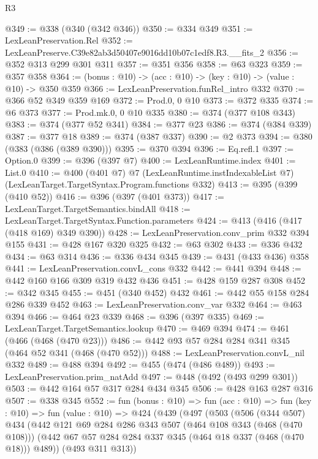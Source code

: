 \begin{lexlean}{R3}
\begin{coremodule}
@349 := @338 (@340 (@342 @346))
@350 := @334 @349
@351 := LexLeanPreservation.Rel
@352 := LexLeanPreserve.C39e82ab3d50407e9016dd10b07c1edf8.R3.__fits_2
@356 := @352 @313 @299 @301 @311
@357 := @351 @356
@358 := @63 @323
@359 := @357 @358
@364 := (bonus : @10) -> (acc : @10) -> (key : @10) -> (value : @10) -> @350 @359
@366 := LexLeanPreservation.funRel_intro @332
@370 := @366 @52 @349 @359 @169
@372 := Prod.{0, 0} @10
@373 := @372 @335
@374 := @6 @373
@377 := Prod.mk.{0, 0} @10 @335
@380 := @374 (@377 @108 @343)
@383 := @374 (@377 @52 @341)
@384 := @377 @23
@386 := @374 (@384 @339)
@387 := @377 @18
@389 := @374 (@387 @337)
@390 := @2 @373
@394 := @380 (@383 (@386 (@389 @390)))
@395 := @370 @394
@396 := Eq.refl.{1}
@397 := Option.{0}
@399 := @396 (@397 @7)
@400 := LexLeanRuntime.index
@401 := List.{0}
@410 := @400
    (@401 @7)
    @7
    (LexLeanRuntime.instIndexableList @7)
    (LexLeanTarget.TargetSyntax.Program.functions @332)
@413 := @395 (@399 (@410 @52))
@416 := @396 (@397 (@401 @373))
@417 := LexLeanTarget.TargetSemantics.bindAll
@418 := LexLeanTarget.TargetSyntax.Function.parameters
@424 := @413 (@416 (@417 (@418 @169) @349 @390))
@428 := LexLeanPreservation.conv_prim @332 @394 @155
@431 := @428 @167 @320 @325
@432 := @63 @302
@433 := @336 @432
@434 := @63 @314
@436 := @336 @434 @345
@439 := @431 (@433 @436) @358
@441 := LexLeanPreservation.convL_cons @332
@442 := @441 @394
@448 := @442 @160 @166 @309 @319 @432 @436
@451 := @428 @159 @287 @308
@452 := @342 @345
@455 := @451 (@340 @452) @432
@461 := @442 @55 @158 @284 @286 @339 @452
@463 := LexLeanPreservation.conv_var @332
@464 := @463 @394
@466 := @464 @23 @339
@468 := @396 (@397 @335)
@469 := LexLeanTarget.TargetSemantics.lookup
@470 := @469 @394
@474 := @461 (@466 (@468 (@470 @23)))
@486 := @442 @93 @57 @284 @284 @341 @345 (@464 @52 @341 (@468 (@470 @52)))
@488 := LexLeanPreservation.convL_nil @332
@489 := @488 @394
@492 := @455 (@474 (@486 @489))
@493 := LexLeanPreservation.prim_natAdd
@497 := @448 (@492 (@493 @299 @301))
@503 := @442 @164 @57 @317 @284 @434 @345
@506 := @428 @163 @287 @316
@507 := @338 @345
@552 := fun (bonus : @10) =>
  fun (acc : @10) =>
  fun (key : @10) =>
  fun (value : @10) =>
  @424
    (@439
      (@497
        (@503
          (@506
            (@344 @507)
            @434
            (@442
              @121
              @69
              @284
              @286
              @343
              @507
              (@464 @108 @343 (@468 (@470 @108)))
              (@442 @67 @57 @284 @284 @337 @345 (@464 @18 @337 (@468 (@470 @18))) @489))
            (@493 @311 @313))

\end{coremodule}
\end{lexlean}
